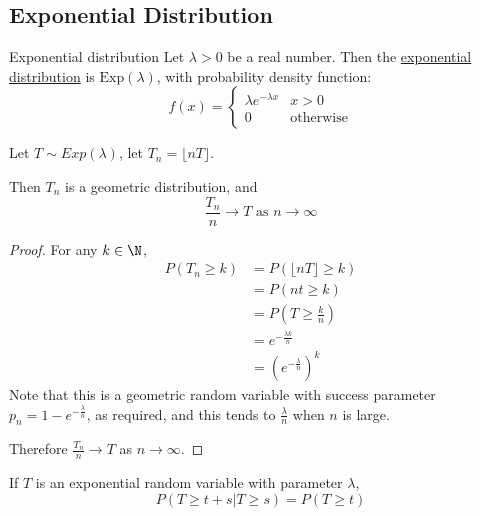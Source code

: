 \documentclass[../Main.tex]{subfiles}
\begin{document}
\subsection{Exponential Distribution}
\begin{definition}{Exponential distribution}
    Let $\lambda > 0$ be a real number. Then the \underline{exponential distribution} is $\text{Exp}(\lambda)$, with probability density function:
    \begin{equation*}
        f(x) =
        \begin{cases}
            \lambda e^{-\lambda x} & x > 0 \\
            0 & \text{otherwise}
        \end{cases}
    \end{equation*}
\end{definition}
\begin{proposition}
    Let $T \sim Exp(\lambda)$, let $T_n = \lfloor nT \rfloor$.\par
    Then $T_n$ is a geometric distribution, and
    \begin{equation*}
        \frac{T_n}{n} \to T \text{ as } n \to \infty
    \end{equation*}
    \label{propExpLimitOfGeom}
\end{proposition}
\begin{proof}
    For any $k \in \N$,
    \begin{align*}
        P(T_n \geq k) &= P(\lfloor nT \rfloor \geq k) \\
        &= P(nt \geq k) \\
        &= P(T \geq \frac{k}{n}) \\
        &= e^{-\frac{\lambda k}{n}} \\
        &= \left(e^{-\frac{\lambda}{n}}\right)^k
    \end{align*}
    Note that this is a geometric random variable with success parameter $p_n = 1 - e^{-\frac{\lambda}{n}}$, as required, and this tends to $\frac{\lambda}{n}$ when $n$ is large.\par
    Therefore $\frac{T_n}{n} \to T$ as $n \to \infty$.
\end{proof}
\begin{proposition}
    If $T$ is an exponential random variable with parameter $\lambda$,
    \begin{equation*}
        P(T \geq t + s | T \geq s) = P(T \geq t)
    \end{equation*}
    \label{propExpMemoryless}
\end{proposition}
\end{document}
